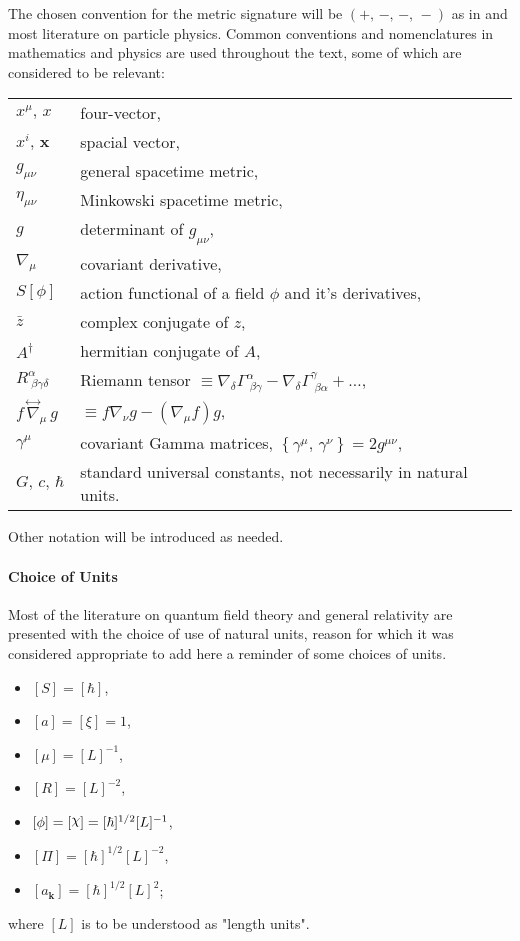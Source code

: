 
The chosen convention for the metric signature will be $(+,\,-,\,-,\,-)$ as in \cite{BirrellDavies} and most literature on particle physics. Common conventions and nomenclatures in mathematics and physics are used throughout the text, some of which are considered to be relevant:\newline

\begin{tabular}{p{1.75cm}p{10cm}}
	
	$x^\mu,\,x$ & four-vector, \\
	$x^i,\,\mathbf{x}$ & spacial vector, \\
	$g_{\mu\nu}$ & general spacetime metric, \\
	$\eta_{\mu\nu}$ & Minkowski spacetime metric, \\
	$g$ & determinant of $g_{\mu\nu}$, \\
	$\nabla_\mu$ & covariant derivative, \\
	$S[\phi]$ & action functional of a field $\phi$ and it's derivatives, \\
	$\bar{z}$ & complex conjugate of $z$, \\
	$A^\dagger$ & hermitian conjugate of $A$,\\
	$R^\alpha_{\;\beta\gamma\delta}$ & Riemann tensor \quad $\equiv \nabla_\delta\Gamma^\alpha_{\;\beta\gamma}-\nabla_\delta\Gamma^\gamma_{\;\beta\alpha}+\hdots$,\\
	$f\,\overset{\leftrightarrow}{\nabla}_\mu\, g$ &$\equiv f\nabla_\nu g-\left(\nabla_\mu f\right)g$, \\
	$\gamma^\mu$ & covariant Gamma matrices, $\left\{\gamma^\mu,\,\gamma^\nu\right\}=2g^{\mu\nu}$, \\
	$G,\,c,\,\hbar$ & standard universal constants, not necessarily in natural units. \\
	
\end{tabular}

\vspace*{0.5cm}
Other notation will be introduced as needed.
\vspace*{2.5cm}
\paragraph{Choice of Units\\}
Most of the literature on quantum field theory and general relativity are presented with the choice of use of natural units, reason for which it was considered appropriate to add here a reminder of some choices of units.
\begin{multicols}{2}
	\begin{itemize}
		\item $[S]=[\hbar]$,
		\item $[a]=[\xi]=1$,
		\item $[\mu]=[L]^{-1}$,
		\item $[R]=[L]^{-2}$,
		\item $[\phi]=[\rchi]=[\hbar]^{1/2}[L]^{-1}$,
		\item $[\Pi]=[\hbar]^{1/2}[L]^{-2}$,
		\item $[a_\mathbf{k}]=[\hbar]^{1/2}[L]^2$;
	\end{itemize}
\end{multicols}

where $[L]$ is to be understood as "length units".